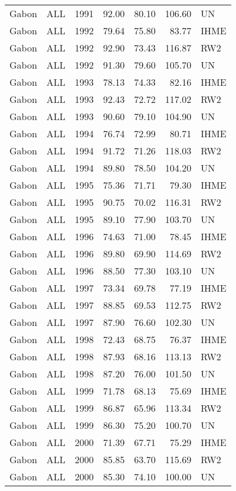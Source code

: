 \begin{longtable}{lllrrrl}
  Gabon & ALL & 1991 & 92.00 & 80.10 & 106.60 & UN \\ 
  Gabon & ALL & 1992 & 79.64 & 75.80 & 83.77 & IHME \\ 
  Gabon & ALL & 1992 & 92.90 & 73.43 & 116.87 & RW2 \\ 
  Gabon & ALL & 1992 & 91.30 & 79.60 & 105.70 & UN \\ 
  Gabon & ALL & 1993 & 78.13 & 74.33 & 82.16 & IHME \\ 
  Gabon & ALL & 1993 & 92.43 & 72.72 & 117.02 & RW2 \\ 
  Gabon & ALL & 1993 & 90.60 & 79.10 & 104.90 & UN \\ 
  Gabon & ALL & 1994 & 76.74 & 72.99 & 80.71 & IHME \\ 
  Gabon & ALL & 1994 & 91.72 & 71.26 & 118.03 & RW2 \\ 
  Gabon & ALL & 1994 & 89.80 & 78.50 & 104.20 & UN \\ 
  Gabon & ALL & 1995 & 75.36 & 71.71 & 79.30 & IHME \\ 
  Gabon & ALL & 1995 & 90.75 & 70.02 & 116.31 & RW2 \\ 
  Gabon & ALL & 1995 & 89.10 & 77.90 & 103.70 & UN \\ 
  Gabon & ALL & 1996 & 74.63 & 71.00 & 78.45 & IHME \\ 
  Gabon & ALL & 1996 & 89.80 & 69.90 & 114.69 & RW2 \\ 
  Gabon & ALL & 1996 & 88.50 & 77.30 & 103.10 & UN \\ 
  Gabon & ALL & 1997 & 73.34 & 69.78 & 77.19 & IHME \\ 
  Gabon & ALL & 1997 & 88.85 & 69.53 & 112.75 & RW2 \\ 
  Gabon & ALL & 1997 & 87.90 & 76.60 & 102.30 & UN \\ 
  Gabon & ALL & 1998 & 72.43 & 68.75 & 76.37 & IHME \\ 
  Gabon & ALL & 1998 & 87.93 & 68.16 & 113.13 & RW2 \\ 
  Gabon & ALL & 1998 & 87.20 & 76.00 & 101.50 & UN \\ 
  Gabon & ALL & 1999 & 71.78 & 68.13 & 75.69 & IHME \\ 
  Gabon & ALL & 1999 & 86.87 & 65.96 & 113.34 & RW2 \\ 
  Gabon & ALL & 1999 & 86.30 & 75.20 & 100.70 & UN \\ 
  Gabon & ALL & 2000 & 71.39 & 67.71 & 75.29 & IHME \\ 
  Gabon & ALL & 2000 & 85.85 & 63.70 & 115.69 & RW2 \\ 
  Gabon & ALL & 2000 & 85.30 & 74.10 & 100.00 & UN \\ 

\end{longtable}
